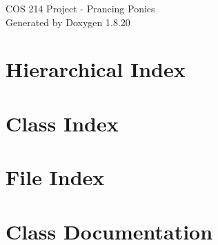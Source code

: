 \let\mypdfximage\pdfximage\def\pdfximage{\immediate\mypdfximage}\documentclass[twoside]{book}
\newcommand{\+}{\discretionary{\mbox{\scriptsize$\hookleftarrow$}}{}{}}
\newcommand{\clearemptydoublepage}{%
  \newpage{\pagestyle{empty}\cleardoublepage}%
}
\begin{document}
\hypersetup{pageanchor=false,
             bookmarksnumbered=true,
             pdfencoding=unicode
            }
\begin{titlepage}
\vspace*{7cm}
\begin{center}%
{\Large C\+OS 214 Project -\/ Prancing Ponies }\\
\vspace*{1cm}
{\large Generated by Doxygen 1.8.20}\\
\end{center}
\end{titlepage}
\clearemptydoublepage
{}
\tableofcontents
\clearemptydoublepage
{}
\hypersetup{pageanchor=true}

\chapter{Hierarchical Index}

\chapter{Class Index}

\chapter{File Index}

\chapter{Class Documentation}

























































\end{document}
